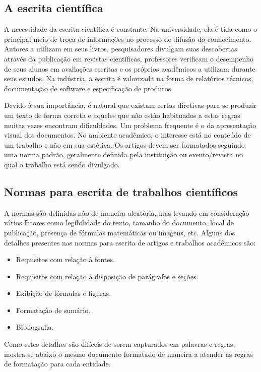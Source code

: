 \subsection{A escrita científica}
A necessidade da escrita científica é constante. Na universidade, ela é tida como o principal meio de troca de informações %
no processo de difusão do conhecimento. Autores a utilizam em seus livros, pesquisadores divulgam suas descobertas através da publicação em revistas científicas, professores verificam o desempenho de seus alunos em avaliações escritas e os próprios acadêmicos a utilizam durante seus estudos. Na indústria, a escrita é valorizada na forma de relatórios técnicos, documentação de software e especificação de produtos.

Devido à sua importância, é natural que existam certas diretivas para se produzir um texto de forma correta e aqueles que não estão habituados a estas regras muitas vezes encontram dificuldades. Um problema frequente é o da apresentação visual dos documentos. No ambiente acadêmico, o interesse está no conteúdo de um trabalho e não em sua estética. Os artigos devem ser formatados seguindo uma norma padrão, geralmente definida pela instituição ou evento/revista no qual o trabalho está sendo divulgado. 

\subsection{Normas para escrita de trabalhos científicos}
A normas são definidas não de maneira aleatória, mas levando em consideração vários fatores como legibilidade do texto, tamanho do documento, local de publicação, presença de fórmulas matemáticas ou imagens, etc. Alguns dos detalhes presentes nas normas para escrita de artigos e trabalhos acadêmicos são:

\begin{itemize}
\item Requisitos com relação à fontes.
\item Requisitos com relação à disposição de parágrafos e seções.
\item Exibição de fórmulas e figuras.
\item Formatação de sumário.
\item Bibliografia.
\end{itemize}

Como estes detalhes são difíceis de serem capturados em palavras e regras, mostra-se abaixo o mesmo documento formatado de maneira a atender as regras de formatação para cada entidade.


